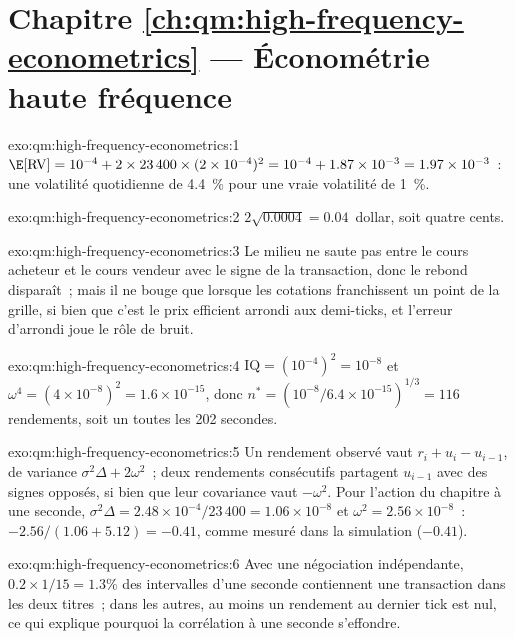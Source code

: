 \section*{Chapitre \ref{ch:qm:high-frequency-econometrics} --- Économétrie haute fréquence}

\begin{solution}{exo:qm:high-frequency-econometrics:1}
$\E[\mathrm{RV}] = 10^{-4} + 2 \times 23\,400 \times (2 \times 10^{-4})^2 = 10^{-4} + 1.87 \times 10^{-3} = 1.97 \times 10^{-3}$~: une volatilité quotidienne de 4.4~\% pour une vraie volatilité de 1~\%.
\end{solution}

\begin{solution}{exo:qm:high-frequency-econometrics:2}
$2\sqrt{0.0004} = 0.04$~dollar, soit quatre cents.
\end{solution}

\begin{solution}{exo:qm:high-frequency-econometrics:3}
Le milieu ne saute pas entre le cours acheteur et le cours vendeur avec le signe de la transaction, donc le rebond disparaît~; mais il ne bouge que lorsque les cotations franchissent un point de la grille, si bien que c'est le prix efficient
arrondi aux demi-ticks, et l'erreur d'arrondi joue le rôle de bruit.
\end{solution}

\begin{solution}{exo:qm:high-frequency-econometrics:4}
$\mathrm{IQ} = (10^{-4})^2 = 10^{-8}$ et $\omega^4 = (4 \times 10^{-8})^2 = 1.6 \times 10^{-15}$, donc $n^* = (10^{-8}/6.4 \times 10^{-15})^{1/3} = 116$ rendements, soit un toutes les 202 secondes.
\end{solution}

\begin{solution}{exo:qm:high-frequency-econometrics:5}
Un rendement observé vaut $r_i + u_i - u_{i-1}$, de variance $\sigma^2\Delta + 2\omega^2$~; deux rendements consécutifs partagent $u_{i-1}$ avec des signes opposés, si bien que leur covariance vaut
$-\omega^2$. Pour l'action du chapitre à une seconde, $\sigma^2\Delta = 2.48 \times 10^{-4}/23\,400 = 1.06 \times 10^{-8}$ et $\omega^2 = 2.56 \times 10^{-8}$~: $-2.56/(1.06 + 5.12) =
-0.41$, comme mesuré dans la simulation ($-0.41$).
\end{solution}

\begin{solution}{exo:qm:high-frequency-econometrics:6}
Avec une négociation indépendante, $0.2 \times 1/15 = 1.3\%$ des intervalles d'une seconde contiennent une transaction dans les deux titres~; dans les autres, au moins un rendement au dernier tick est nul, ce qui explique pourquoi la
corrélation à une seconde s'effondre.
\end{solution}

